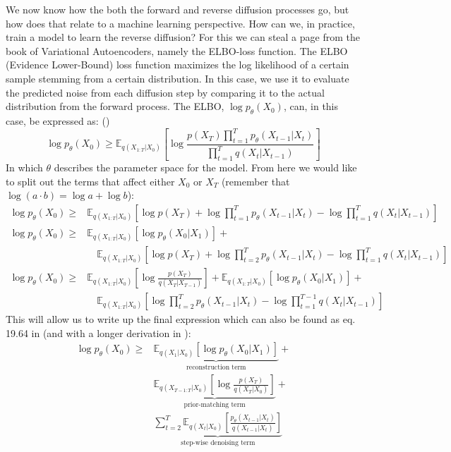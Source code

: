 \documentclass[a4paper, 12pt]{olplainarticle}
\begin{document}
We now know how the both the forward and reverse diffusion processes go, but how does that relate to a machine learning perspective.
How can we, in practice, train a model to learn the reverse diffusion?
For this we can steal a page from the book of Variational Autoencoders, namely the ELBO-loss function.
The ELBO (Evidence Lower-Bound) loss function maximizes the log likelihood of a certain sample stemming from a certain distribution.
In this case, we use it to evaluate the predicted noise from each diffusion step by comparing it to the actual distribution from the forward process.
The ELBO, $\log p_{\theta}(X_0)$, can, in this case, be expressed as: (\cite{intro-diffusion-process})
\begin{equation}
    \log p_{\theta}(X_0) \geq \mathbb{E}_{q(X_{1:T}|X_0)}\left[ \log \frac{p(X_T) \prod_{t=1}^{T} p_{\theta}(X_{t-1}|X_t)}{\prod_{t=1}^{T} q(X_t|X_{t-1})} \right]
\end{equation}
In which $\theta$ describes the parameter space for the model.
From here we would like to split out the terms that affect either $X_0$ or $X_T$ (remember that $\log(a \cdot b) = \log a + \log b$):
\begin{align}
    \log p_{\theta}(X_0) \geq& \mathbb{E}_{q(X_{1:T}|X_0)}\left[ \log p(X_T) + \log \prod_{t=1}^{T}p_{\theta}(X_{t-1}|X_t) - \log \prod_{t=1}^{T} q(X_t|X_{t-1}) \right]\\
    \log p_{\theta}(X_0) \geq&\mathbb{E}_{q(X_{1:T}|X_0)} [\log p_{\theta}(X_0|X_1)] + \\
    &\quad \mathbb{E}_{q(X_{1:T}|X_0)}\left[ \log p(X_T) + \log \prod_{t=2}^{T}p_{\theta}(X_{t-1}|X_t) - \log \prod_{t=1}^{T} q(X_t|X_{t-1}) \right]\\
    \log p_{\theta}(X_0) \geq&\mathbb{E}_{q(X_{1:T}|X_0)} \left[ \log \frac{p(X_T)}{q(X_T|X_{T-1})} \right] + \mathbb{E}_{q(X_{1:T}|X_0)} [\log p_{\theta}(X_0|X_1)] +\\
    &\quad \mathbb{E}_{q(X_{1:T}|X_0)}\left[ \log \prod_{t=2}^{T}p_{\theta}(X_{t-1}|X_t) - \log \prod_{t=1}^{T-1} q(X_t|X_{t-1}) \right]
\end{align}
This will allow us to write up the final expression which can also be found as eq. 19.64 in \cite{ml-book} (and with a longer derivation in \cite{intro-diffusion-process}):
\begin{align}
    \log p_{\theta}(X_0) \geq &\underbrace{\mathbb{E}_{q(X_{1}|X_0)} [\log p_{\theta}(X_0|X_1)]}_{\text{reconstruction term}} +\\
    &\underbrace{\mathbb{E}_{q(X_{T-1:T}|X_0)} \left[ \log \frac{p(X_T)}{q(X_T|X_{0})} \right]}_{\text{prior-matching term}} + \\
    &\underbrace{\sum_{t=2}^{T}\mathbb{E}_{q(X_{t}|X_0)}\left[\frac{p_{\theta}(X_{t-1}|X_{t})}{q(X_{t-1}|X_{t})} \right]}_{\text{step-wise denoising term}}
\end{align}
\end{document}
